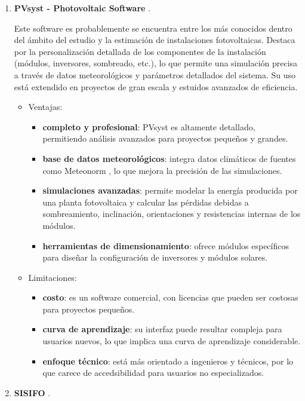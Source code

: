 \begin{enumerate}
\item \textbf{PVsyst - Photovoltaic Software} \cite{pvsyst}.

Este software es probablemente se encuentra entre los más conocidos dentro del ámbito del estudio y la estimación de instalaciones fotovoltaicas. Destaca por la personalización detallada de los componentes de la instalación (módulos, inversores, sombreado, etc.), lo que permite una simulación precisa a través de datos meteorológicos y parámetros detallados del sistema. Su uso está extendido en proyectos de gran escala y estuidos avanzados de eficiencia.
\begin{itemize}
\item Ventajas:
\begin{itemize}
\item \textbf{completo y profesional}: PVsyst es altamente detallado, permitiendo análisis avanzados para proyectos pequeños y grandes.
\item \textbf{base de datos meteorológicos}: integra datos climáticos de fuentes como Meteonorm \cite{jan20}, lo que mejora la precisión de las simulaciones.
\item \textbf{simulaciones avanzadas}: permite modelar la energía producida por una planta fotovoltaica y calcular las pérdidas debidas a sombreamiento, inclinación, orientaciones y resistencias internas de los módulos.
\item \textbf{herramientas de dimensionamiento}: ofrece módulos específicos para diseñar la configuración de inversores y módulos solares.
\end{itemize}
\item Limitaciones:
\begin{itemize}
\item \textbf{costo}: es un software comercial, con licencias que pueden ser costosas para proyectos pequeños.
\item \textbf{curva de aprendizaje}: su interfaz puede resultar compleja para usuarios nuevos, lo que implica una curva de aprendizaje considerable.
\item \textbf{enfoque técnico}: está más orientado a ingenieros y técnicos, por lo que carece de accedsibilidad para usuarios no especializados.
\end{itemize}
\end{itemize}
\item \textbf{SISIFO} \cite{sisifo}.


\end{enumerate}

